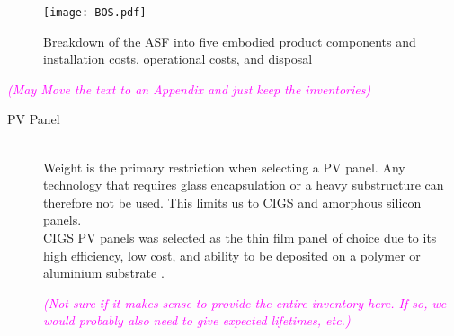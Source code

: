 \begin{figure}[ht]
\begin{center}
\texttt{[image: BOS.pdf]}
\caption{Breakdown of the ASF into five embodied product components and installation costs, operational costs, and disposal}
\label{fig:BOS}
\end{center}
\end{figure}
\textcolor{magenta}{\textit{(May Move the text to an Appendix and just keep the inventories)}}
\begin{description}

\item[PV Panel] \hfill\\
Weight is the primary restriction when selecting a PV panel. Any technology that requires glass encapsulation or a heavy substructure can therefore not be used. This limits us to CIGS and amorphous silicon panels.\\

CIGS PV panels was selected as the thin film panel of choice due to its high efficiency, low cost, and ability to be deposited on a polymer or aluminium substrate \cite{chirilua2011highly}. 


\textcolor{magenta}{\textit{(Not sure if it makes sense to provide the entire inventory here. If so, we would probably also need to give expected lifetimes, etc.)}}



\end{description}
